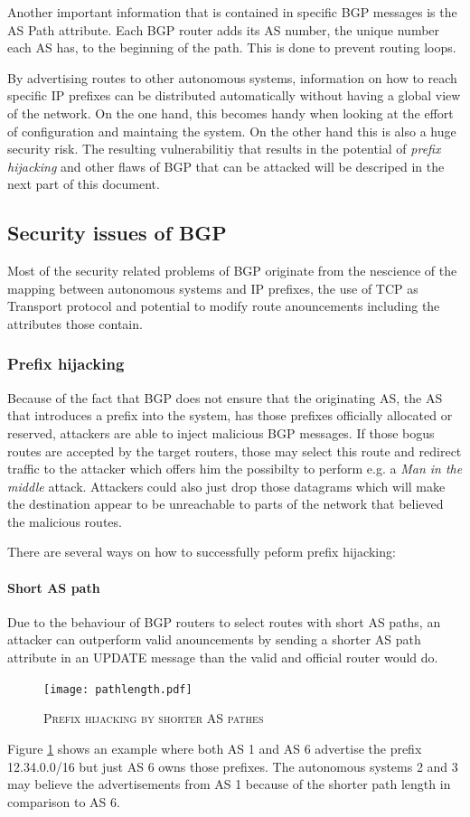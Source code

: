 \documentclass[12pt,a4paper]{IEEEtran}
\begin{document}
	Another important information that is contained in specific BGP messages is the  AS Path attribute. Each BGP router adds its AS number, the unique number each AS has, to the beginning of the path. This is done to prevent routing loops. 

	By advertising routes to other autonomous systems, information on how to reach specific IP prefixes can be distributed automatically without having a global view of the network. On the one hand, this becomes handy when looking at the effort of configuration and maintaing the system. On the other hand this is also a huge security risk.
	The resulting vulnerabilitiy that results in the potential of \emph{prefix hijacking} and other flaws of BGP that can be attacked will be descriped in the next part of this document. 
	
	\subsection{Security issues of BGP}
		Most of the security related problems of BGP originate from the nescience of the mapping between autonomous systems and IP prefixes, the use of TCP as Transport protocol and potential to modify route anouncements including the attributes those contain.

		\subsubsection{Prefix hijacking}
		Because of the fact that BGP does not ensure that the originating AS, the AS that introduces a prefix into the system, has those prefixes officially allocated or reserved, attackers are able to inject malicious BGP messages. 
		If those bogus routes are accepted by the target routers, those may select this route and redirect traffic to the attacker which offers him the possibilty to perform e.g. a \emph{Man in the middle} attack. Attackers could also just drop those datagrams which will make the destination appear to be unreachable to parts of the network that believed the malicious routes. 

		There are several ways on how to successfully peform prefix hijacking:
		\paragraph{Short AS path}
		Due to the behaviour of BGP routers to select routes with short AS paths, an attacker can outperform valid anouncements by sending a shorter AS path attribute in an UPDATE message than the valid and official router would do. 
		\begin{figure}[ht!]
			\begin{center}
				\texttt{[image: pathlength.pdf]}
				\caption{\textsc{Prefix hijacking by shorter AS pathes}}
			\end{center}
			\label{shortpath}
		\end{figure}
		Figure \ref{shortpath} shows an example where both AS 1 and AS 6 advertise the prefix 12.34.0.0/16 but just AS 6 owns those prefixes. The autonomous systems 2 and 3 may believe the advertisements from AS 1 because of the shorter path length in comparison to AS 6.
\end{document}
